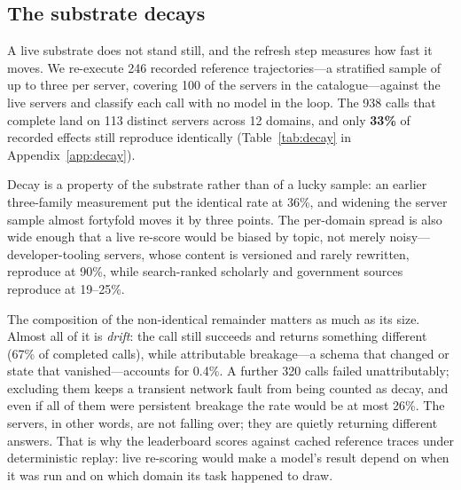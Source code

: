 \subsection{The substrate decays}
\label{sec:results:decay}
A live substrate does not stand still, and the refresh step measures how fast
it moves. We re-execute 246 recorded reference trajectories---a stratified
sample of up to three per server, covering 100 of the servers in the
catalogue---against the live servers and classify each call with no model in
the loop. The 938 calls that complete land on 113 distinct servers across 12
domains, and only \textbf{33\%} of recorded effects still reproduce identically
(Table~\ref{tab:decay} in Appendix~\ref{app:decay}).

Decay is a property of the substrate rather than of a lucky sample: an
earlier three-family measurement put the identical rate at 36\%, and widening
the server sample almost fortyfold moves it by three points. The per-domain
spread is also wide enough that a live re-score would be biased by topic,
not merely noisy---developer-tooling servers, whose content is versioned and
rarely rewritten, reproduce at 90\%, while search-ranked scholarly and
government sources reproduce at 19--25\%.

The composition of the non-identical remainder matters as much as its size.
Almost all of it is \emph{drift}: the call still succeeds and returns something
different (67\% of completed calls), while attributable breakage---a schema that
changed or state that vanished---accounts for 0.4\%. A further 320 calls failed
unattributably; excluding them keeps a transient network fault from being
counted as decay, and even if all of them were persistent breakage the rate
would be at most 26\%. The servers, in other words, are not falling over; they
are quietly returning different answers. That is why the leaderboard scores
against cached reference traces under deterministic replay: live re-scoring
would make a model's result depend on when it was run and on which domain its
task happened to draw.
